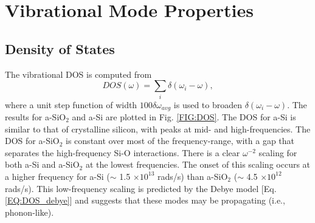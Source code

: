 \documentclass[aps,prb,twocolumn,superscriptaddress,footinbib,amsmath,amssymb,floatfix]{revtex4}
\begin{document}
\section{\label{S:Vibrational}Vibrational Mode Properties}

\subsection{\label{S:DOS}Density of States}

The vibrational DOS is computed from  
\begin{equation}\label{EQ:DOS}
DOS(\omega) = \sum_i \delta(\omega_i - \omega),
\end{equation}
where a unit step function of width $100\delta\omega_{avg}$ 
is used to broaden $\delta(\omega_i - \omega)$.   
The results for a-SiO$_2$ and a-Si are plotted in Fig. \ref{FIG:DOS}. 
The DOS for a-Si is similar to that of crystalline silicon,
\cite{donadio_atomistic_2009} with 
peaks at mid- and high-frequencies. The DOS for 
a-SiO$_2$ is constant over most of the frequency-range, 
with a gap that separates the high-frequency Si-O
interactions. 
There is a clear $\omega^{-2}$ scaling for both 
a-Si and a-SiO$_2$ at the lowest frequencies. 
The onset of this scaling occurs at a higher frequency 
for a-Si ($\sim$ 1.5 $\times 10^{13}$ rads/s) 
than a-SiO$_2$ ($\sim$ 4.5 $\times 10^{12}$ rads/s). 
This low-frequency scaling is predicted 
by the Debye model [Eq. \eqref{EQ:DOS_debye}] 
and suggests that these modes may be 
propagating (i.e., phonon-like). 
\end{document}
